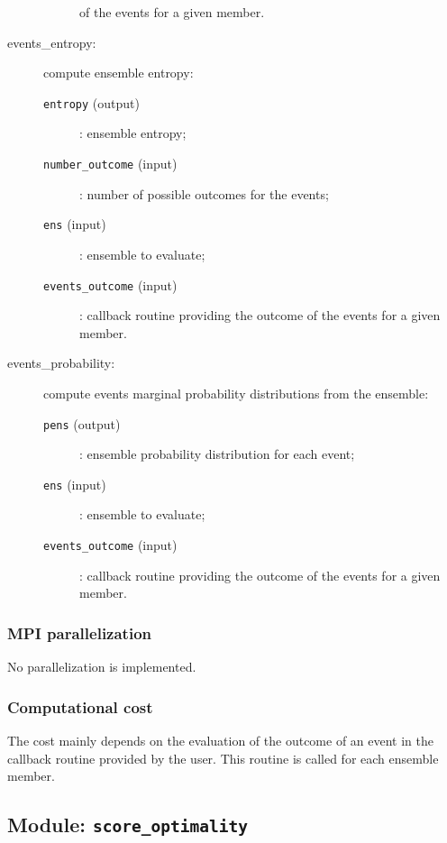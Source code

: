 \documentclass[11pt]{article}
\begin{document}
\begin{description}
\begin{description}
                                        of the events for a given member.
  \end{description}
\item[events\_entropy:] compute ensemble entropy:
  \begin{description}
  \item[{\tt entropy} (output)]: ensemble entropy;
  \item[{\tt number\_outcome} (input)]: number of possible outcomes for the events;
  \item[{\tt ens} (input)]: ensemble to evaluate;
  \item[{\tt events\_outcome} (input)]: callback routine providing the outcome
                                        of the events for a given member.
  \end{description}
\item[events\_probability:] compute events marginal probability distributions from the ensemble:
  \begin{description}
  \item[{\tt pens} (output)]: ensemble probability distribution for each event;
  \item[{\tt ens} (input)]: ensemble to evaluate;
  \item[{\tt events\_outcome} (input)]: callback routine providing the outcome
                                        of the events for a given member.
  \end{description}
\end{description}

\subsubsection*{MPI parallelization}

No parallelization is implemented.

\subsubsection*{Computational cost}

The cost mainly depends on the evaluation of the outcome of an event
in the callback routine provided by the user.
This routine is called for each ensemble member.

\subsection{Module: {\tt\bf score\_optimality}}
\end{document}
